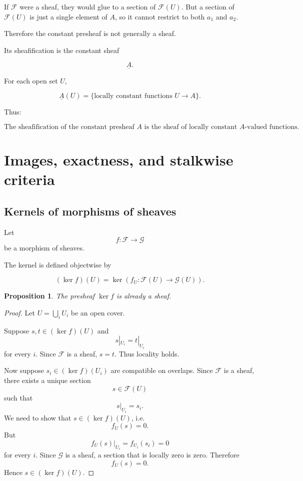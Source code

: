 \documentclass[12pt,a4paper]{article}
\theoremstyle{notespace}
\newtheorem{proposition}[definition]{Proposition}
\begin{document}
If $\mathcal F$ were a sheaf, they would glue to a section of $\mathcal F(U)$.
But a section of $\mathcal F(U)$ is just a single element of $A$, so it cannot
restrict to both $a_1$ and $a_2$.

Therefore the constant presheaf is not generally a sheaf.

Its sheafification is the constant sheaf

\[
\underline{A}.
\]

For each open set $U$,

\[
\underline{A}(U)
=
\{
\text{locally constant functions } U \to A
\}.
\]

Thus:

\[
\boxed{
	\text{The sheafification of the constant presheaf } A
	\text{ is the sheaf of locally constant } A\text{-valued functions.}
}
\]

\section{Images, exactness, and stalkwise criteria}

\subsection{Kernels of morphisms of sheaves}
Let
\[
f:\mathcal F \longrightarrow \mathcal G
\]
be a morphism of sheaves.

The kernel is defined objectwise by

\[
(\ker f)(U)
=
\ker
\left(
f_U:\mathcal F(U)\to\mathcal G(U)
\right).
\]

\begin{proposition}
	The presheaf $\ker f$ is already a sheaf.
\end{proposition}

\begin{proof}
	Let $U=\bigcup_i U_i$ be an open cover.
	
	Suppose $s,t \in (\ker f)(U)$ and
	\[
	s|_{U_i}=t|_{U_i}
	\]
	for every $i$.
	Since $\mathcal F$ is a sheaf, $s=t$.
	Thus locality holds.
	
	Now suppose $s_i \in (\ker f)(U_i)$ are compatible on overlaps.
	Since $\mathcal F$ is a sheaf, there exists a unique section
	\[
	s \in \mathcal F(U)
	\]
	such that
	\[
	s|_{U_i}=s_i.
	\]
	We need to show that $s \in (\ker f)(U)$, i.e.
	\[
	f_U(s)=0.
	\]
	But
	\[
	f_U(s)|_{U_i}
	=
	f_{U_i}(s_i)
	=
	0
	\]
	for every $i$.
	Since $\mathcal G$ is a sheaf, a section that is locally zero is zero.
	Therefore
	\[
	f_U(s)=0.
	\]
	Hence $s \in (\ker f)(U)$.
\end{proof}
\end{document}
